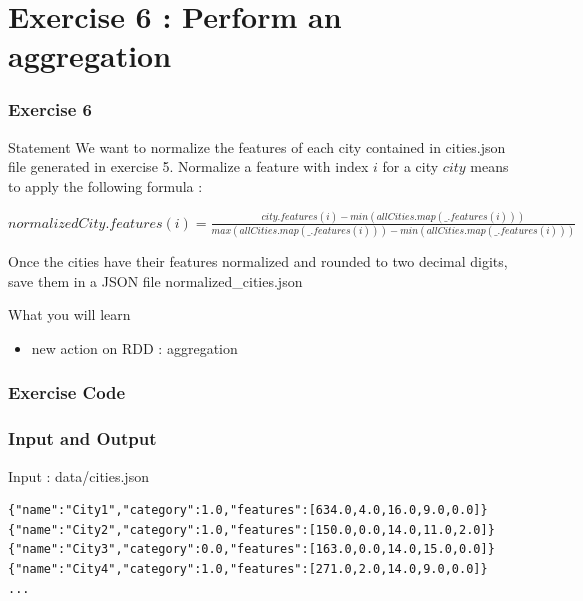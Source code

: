 \documentclass[slidetop,9pt,utf8]{beamer}
\begin{document}
\begin{CJK}{UTF8}{gbsn}
\begin{frame}[fragile]
\end{frame}

%
%
%
%

\section{Exercise 6 : Perform an aggregation}

\begin{frame}
  \frametitle{Exercise 6}

  \begin{block}{Statement}
    We want to normalize the features of each city contained in cities.json file generated in exercise 5. Normalize a feature with index $i$ for a city $city$ means to apply the following formula :
\begin{center} 
    $normalizedCity.features(i) = \frac{city.features(i) - min(allCities.map(\_.features(i)))}{max(allCities.map(\_.features(i))) - min(allCities.map(\_.features(i)))}$
\end{center}
Once the cities have their features normalized and rounded to two decimal digits, save them in a JSON file normalized\_cities.json
  \end{block}

  \begin{block}{What you will learn}
    \begin{itemize}
      \item new action on RDD : aggregation
    \end{itemize}
  \end{block}

\end{frame}

\begin{frame}
  \frametitle{Exercise Code}

  

\end{frame}

\begin{frame}[fragile]

  \frametitle{Input and Output}
  
  \begin{block}{Input : data/cities.json}
    \begin{verbatim}
{"name":"City1","category":1.0,"features":[634.0,4.0,16.0,9.0,0.0]}
{"name":"City2","category":1.0,"features":[150.0,0.0,14.0,11.0,2.0]}
{"name":"City3","category":0.0,"features":[163.0,0.0,14.0,15.0,0.0]}
{"name":"City4","category":1.0,"features":[271.0,2.0,14.0,9.0,0.0]}
...
    \end{verbatim}
  \end{block}


\end{frame}
\end{CJK}
\end{document}
